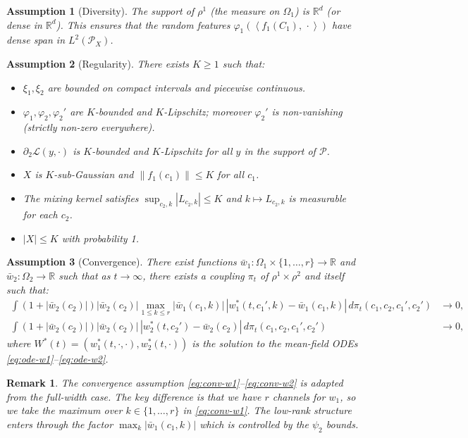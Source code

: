 \documentclass[11pt]{article}
\newcommand{\R}{\mathbb{R}}
\newcommand{\1}{\mathbbm{1}}
\newcommand{\ip}[2]{\left\langle #1,\,#2 \right\rangle}
\newcommand{\norm}[1]{\left\lVert #1 \right\rVert}
\newtheorem{assumption}{Assumption}
\newtheorem{remark}{Remark}
\begin{document}
\begin{assumption}[Diversity]\label{assump:diversity-lowrank}
The support of $\rho^1$ (the measure on $\Omega_1$) is $\R^d$ (or dense in $\R^d$). This ensures that the random features $\varphi_1(\ip{f_1(C_1)}{\cdot})$ have dense span in $L^2(\mathcal{P}_X)$.
\end{assumption}

\begin{assumption}[Regularity]\label{assump:regularity-lowrank}
There exists $K\ge 1$ such that:
\begin{itemize}
\item $\xi_1,\xi_2$ are bounded on compact intervals and piecewise continuous.
\item $\varphi_1,\varphi_2,\varphi_2'$ are $K$-bounded and $K$-Lipschitz; moreover $\varphi_2'$ is non-vanishing (strictly non-zero everywhere).
\item $\partial_2\mathcal{L}(y,\cdot)$ is $K$-bounded and $K$-Lipschitz for all $y$ in the support of $\mathcal{P}$.
\item $X$ is $K$-sub-Gaussian and $\norm{f_1(c_1)}\le K$ for all $c_1$.
\item The mixing kernel satisfies $\sup_{c_2,k}|L_{c_2,k}|\le K$ and $k\mapsto L_{c_2,k}$ is measurable for each $c_2$.
\item $|X|\le K$ with probability 1.
\end{itemize}
\end{assumption}

\begin{assumption}[Convergence]\label{assump:convergence-lowrank}
There exist functions $\bar{w}_1:\Omega_1\times\{1,\dots,r\}\to\R$ and $\bar{w}_2:\Omega_2\to\R$ such that as $t\to\infty$, there exists a coupling $\pi_t$ of $\rho^1\times\rho^2$ and itself such that:
\begin{align}
\int (1+|\bar{w}_2(c_2)|)|\bar{w}_2(c_2)|\max_{1\le k\le r}|\bar{w}_1(c_1,k)|\,|w_1^*(t,c_1',k)-\bar{w}_1(c_1,k)|\,d\pi_t(c_1,c_2,c_1',c_2') &\to 0, \label{eq:conv-w1}\\
\int (1+|\bar{w}_2(c_2)|)|\bar{w}_2(c_2)|\,|w_2^*(t,c_2')-\bar{w}_2(c_2)|\,d\pi_t(c_1,c_2,c_1',c_2') &\to 0, \label{eq:conv-w2}
\end{align}
where $W^*(t)=(w_1^*(t,\cdot,\cdot),w_2^*(t,\cdot))$ is the solution to the mean-field ODEs \eqref{eq:ode-w1}--\eqref{eq:ode-w2}.
\end{assumption}

\begin{remark}
The convergence assumption \eqref{eq:conv-w1}--\eqref{eq:conv-w2} is adapted from the full-width case. The key difference is that we have $r$ channels for $w_1$, so we take the maximum over $k\in\{1,\dots,r\}$ in \eqref{eq:conv-w1}. The low-rank structure enters through the factor $\max_k|\bar{w}_1(c_1,k)|$ which is controlled by the $\psi_2$ bounds.
\end{remark}
\end{document}
